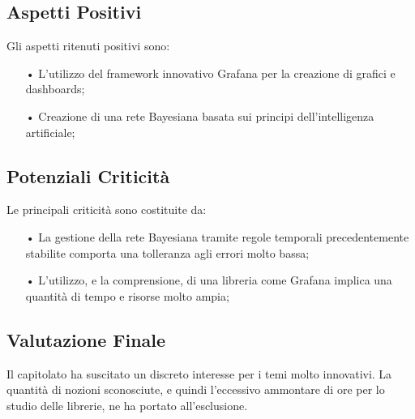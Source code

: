 \subsection{Aspetti Positivi}

Gli aspetti ritenuti positivi sono: 
\begin{itemize}

\item[•] L'utilizzo del framework innovativo Grafana per la creazione di grafici e dashboards;
\item[•] Creazione di una rete Bayesiana basata sui principi dell'intelligenza artificiale;

\end{itemize}

\subsection{Potenziali Criticità}
Le principali criticità sono costituite da: 
\begin{itemize}

\item[•]La gestione della rete Bayesiana tramite regole temporali precedentemente stabilite comporta una tolleranza agli errori molto bassa;

\item[•] L'utilizzo, e la comprensione, di una libreria come Grafana implica una quantità di tempo e risorse molto ampia;

\end{itemize}


\subsection{Valutazione Finale}
Il capitolato ha suscitato un discreto interesse per i temi molto innovativi. 
La quantità di nozioni sconosciute, e quindi l'eccessivo ammontare di ore per lo studio delle librerie, ne ha portato all'esclusione. 